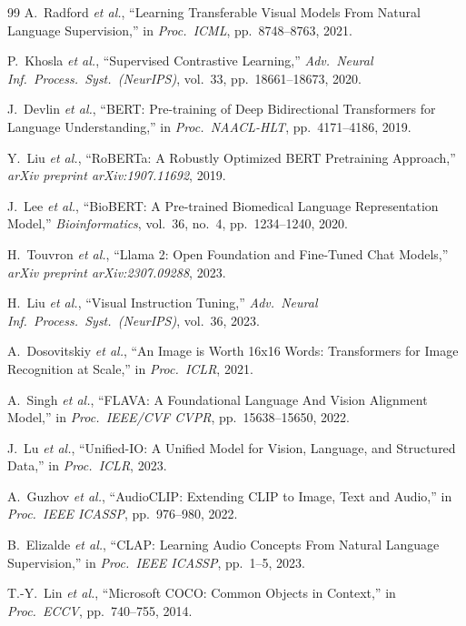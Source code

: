 \documentclass[10pt,conference]{IEEEtran}
\theoremstyle{ieeethm}
\theoremstyle{ieeedef}
\theoremstyle{ieeeremark}
\begin{document}
\begin{thebibliography}{99}
A.~Radford \textit{et al.},
``Learning Transferable Visual Models From Natural Language Supervision,''
in \textit{Proc.\ ICML}, pp.~8748--8763, 2021.

P.~Khosla \textit{et al.},
``Supervised Contrastive Learning,''
\textit{Adv.\ Neural Inf.\ Process.\ Syst.\ (NeurIPS)}, vol.~33, pp.~18661--18673, 2020.

J.~Devlin \textit{et al.},
``BERT: Pre-training of Deep Bidirectional Transformers for Language Understanding,''
in \textit{Proc.\ NAACL-HLT}, pp.~4171--4186, 2019.

Y.~Liu \textit{et al.},
``RoBERTa: A Robustly Optimized BERT Pretraining Approach,''
\textit{arXiv preprint arXiv:1907.11692}, 2019.

J.~Lee \textit{et al.},
``BioBERT: A Pre-trained Biomedical Language Representation Model,''
\textit{Bioinformatics}, vol.~36, no.~4, pp.~1234--1240, 2020.

H.~Touvron \textit{et al.},
``Llama 2: Open Foundation and Fine-Tuned Chat Models,''
\textit{arXiv preprint arXiv:2307.09288}, 2023.

H.~Liu \textit{et al.},
``Visual Instruction Tuning,''
\textit{Adv.\ Neural Inf.\ Process.\ Syst.\ (NeurIPS)}, vol.~36, 2023.

A.~Dosovitskiy \textit{et al.},
``An Image is Worth 16x16 Words: Transformers for Image Recognition at Scale,''
in \textit{Proc.\ ICLR}, 2021.

A.~Singh \textit{et al.},
``FLAVA: A Foundational Language And Vision Alignment Model,''
in \textit{Proc.\ IEEE/CVF CVPR}, pp.~15638--15650, 2022.

J.~Lu \textit{et al.},
``Unified-IO: A Unified Model for Vision, Language, and Structured Data,''
in \textit{Proc.\ ICLR}, 2023.

A.~Guzhov \textit{et al.},
``AudioCLIP: Extending CLIP to Image, Text and Audio,''
in \textit{Proc.\ IEEE ICASSP}, pp.~976--980, 2022.

B.~Elizalde \textit{et al.},
``CLAP: Learning Audio Concepts From Natural Language Supervision,''
in \textit{Proc.\ IEEE ICASSP}, pp.~1--5, 2023.

T.-Y.~Lin \textit{et al.},
``Microsoft COCO: Common Objects in Context,''
in \textit{Proc.\ ECCV}, pp.~740--755, 2014.


\end{thebibliography}
\end{document}
